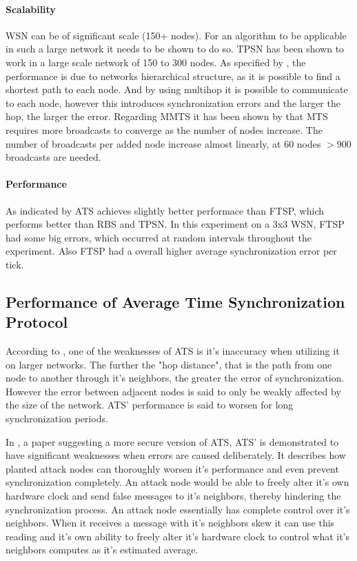 \documentclass[a4paper,12pt]{article}
\begin{document}
\paragraph{Scalability}

WSN can be of significant scale (150+ nodes). For an algorithm to be applicable in such a large network it needs to be shown to do so. TPSN has been shown to work in a large scale network of 150 to 300 nodes. As specified by \cite{GaneriwalEtAl03}, the performance is due to networks hierarchical structure, as it is possible to find a shortest path to each node. And by using multihop it is possible to communicate to each node, however this introduces synchronization errors and the larger the hop, the larger the error. Regarding MMTS it has been shown by \citet{HeLiChenCheng13} that MTS requires more broadcasts to converge as the number of nodes increase. The number of broadcasts per added node increase almost linearly, at 60 nodes $>900$ broadcasts are needed. 

\paragraph{Performance}

As indicated by \cite{LucaFiorentin11} ATS achieves slightly better performace than FTSP, which performs better than RBS and TPSN. In this experiment on a 3x3 WSN, FTSP had some big errors, which occurred at random intervals throughout the experiment. Also FTSP had a overall higher average synchronization error per tick.

\subsection{Performance of Average Time Synchronization Protocol} 

According to \citet{LucaFiorentin11}, one of the weaknesses of ATS is it's inaccuracy when utilizing it on larger networks. The further the "hop distance", that is the path from one node to another through it's neighbors, the greater the error of synchronization. However the error between adjacent nodes is said to only be weakly affected by the size of the network. ATS' performance is said to worsen for long synchronization periods.

In \citet{HeChengShiChen13}, a paper suggesting a more secure version of ATS, ATS' is demonstrated to have significant weaknesses when errors are caused deliberately. It describes how planted attack nodes can thoroughly worsen it's performance and even prevent synchronization completely. An attack node would be able to freely alter it's own hardware clock and send false messages to it's neighbors, thereby hindering the synchronization process. An attack node essentially has complete control over it's neighbors. When it receives a message with it's neighbors skew it can use this reading and it's own ability to freely alter it's hardware clock to control what it's neighbors computes as it's estimated average.
\end{document}
